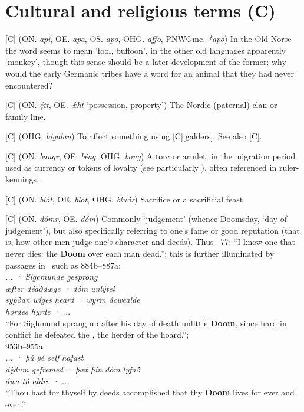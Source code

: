 
\section{Cultural and religious terms (C)}
\begin{itemize}

[C] (ON. \emph{api}, OE. \emph{apa}, OS. \emph{apo}, OHG. \emph{affo}, PNWGmc. \emph{*apó})
  In the Old Norse the word seems to mean ‘fool, buffoon’, in the other old languages apparently ‘monkey’, though this sense should be a later development of the former; why would the early Germanic tribes have a word for an animal that they had never encountered?

[C] (ON. \emph{ę́tt}, OE. \emph{ǽht} ‘possession, property’)
  The Nordic (paternal) clan or family line.

[C] (OHG. \emph{bigalan})
  To affect something using [C][galders]. See also [C].

[C] (ON. \emph{baugr}, OE. \emph{béag}, OHG. \emph{boug})
  A torc or armlet, in the migration period used as currency or tokens of loyalty (see particularly \Hildebrandslied). often referenced in ruler-kennings.

[C] (ON. \emph{blót}, OE. \emph{blót}, OHG. \emph{bluóz})
  Sacrifice or a sacrificial feast.

[C] (ON. \emph{dómr}, OE. \emph{dóm})
  Commonly ‘judgement’ (whence Doomsday, ‘day of judgement’), but also specifically referring to one’s fame or good reputation (that is, how other men judge one’s character and deeds). Thus \Havamal\ 77: “I know one that never dies: the \textbf{Doom} over each man dead.”; this is further illuminated by passages in \Beowulf\ such as 884b–887a: \\ \emph{... · Sigemunde gesprong \\ æfter déaðdæge · dóm unlýtel \\ syþðan wíges heard · wyrm ácwealde \\ hordes hyrde · ...} \\ “For Sighmund sprang up after his day of death unlittle \textbf{Doom}, since hard in conflict he defeated the , the herder of the hoard.”; \\ 953b–955a: \\ \emph{... · þú þé self hafast \\ dę́dum gefremed · þæt þín dóm lyfað \\ áwa tó aldre · ...} \\ “Thou hast for thyself by deeds accomplished that thy \textbf{Doom} lives for ever and ever.”


\end{itemize}
